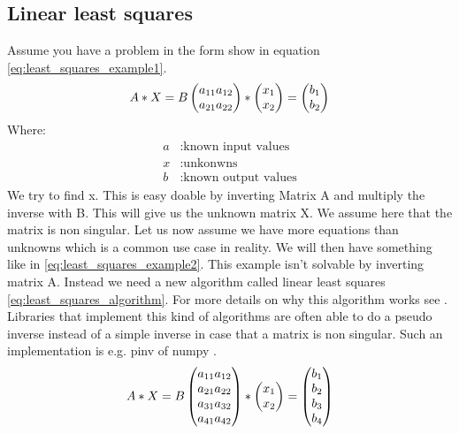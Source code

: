 \documentclass[11pt,a4paper,titlepage,oneside]{report}
\begin{document}
\subsection{Linear least squares}
Assume you have a problem in the form show in equation \ref{eq:least_squares_example1}.
\begin{equation}\label{eq:least_squares_example1}
  A*X=B \\ 
  \begin{pmatrix}
    a_{11} a_{12} \\
    a_{21} a_{22}
  \end{pmatrix}*
  \begin{pmatrix}
    x_1 \\
    x_2
  \end{pmatrix}=
  \begin{pmatrix}
    b_1 \\
    b_2
  \end{pmatrix}
\end{equation}
Where:
\begin{align*}
  a		  &: \text{known input values}\\
  x	  	&: \text{unkonwns}\\
  b		  &: \text{known output values}
\end{align*}
We try to find x. This is easy doable by inverting Matrix A and multiply the inverse with B. This will give us the unknown matrix X. We assume here that the matrix is non singular. Let us now assume we have more equations than unknowns which is a common use case in reality. We will then have something like in \ref{eq:least_squares_example2}. This example isn't solvable by inverting matrix A. Instead we need a new algorithm called linear least squares \ref{eq:least_squares_algorithm}. For more details on why this algorithm works see \cite{Monson}. Libraries that implement this kind of algorithms are often able to do a pseudo inverse instead of a simple inverse in case that a matrix is non singular. Such an implementation is e.g. pinv of numpy \cite{pinv}.
\begin{equation}\label{eq:least_squares_example2}
  A*X=B \\ 
  \begin{pmatrix}
    a_{11} a_{12} \\
    a_{21} a_{22} \\
    a_{31} a_{32} \\
    a_{41} a_{42}
  \end{pmatrix}*
  \begin{pmatrix}
    x_1 \\
    x_2
  \end{pmatrix}=
  \begin{pmatrix}
    b_1 \\
    b_2 \\
    b_3 \\
    b_4
  \end{pmatrix}
\end{equation}
\end{document}
